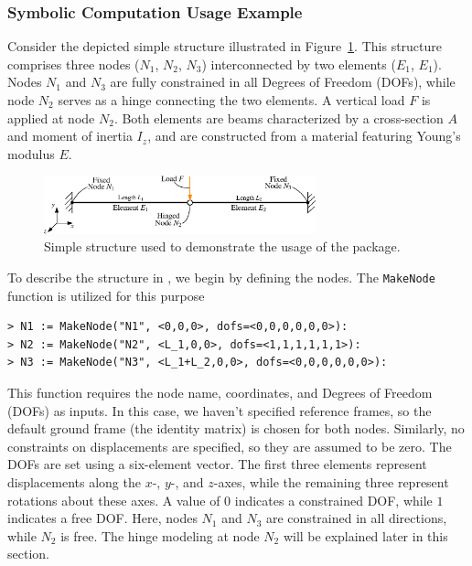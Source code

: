 \subsubsection*{\TrussMe{} Symbolic Computation Usage Example}

Consider the depicted simple structure illustrated in Figure~\ref{chap5:fig:usage_example}. This structure comprises three nodes ($N_1$, $N_2$, $N_3$) interconnected by two elements ($E_1$, $E_1$). Nodes $N_1$ and $N_3$ are fully constrained in all Degrees of Freedom (\acp{DOF}), while node $N_2$ serves as a hinge connecting the two elements. A vertical load $F$ is applied at node $N_2$. Both elements are beams characterized by a cross-section $A$ and moment of inertia $I_z$, and are constructed from a material featuring Young's modulus $E$.

\begin{figure}[!ht]
  \centering
  \includegraphics[width=0.7\textwidth]{./figures/chapter_5/usage_example.eps}
  \caption{Simple structure used to demonstrate the usage of the \TrussMe{} package.}
  \label{chap5:fig:usage_example}
\end{figure}

To describe the structure in \TrussMe{}, we begin by defining the nodes. The \texttt{MakeNode} function is utilized for this purpose
%
\begin{verbatim}
> N1 := MakeNode("N1", <0,0,0>, dofs=<0,0,0,0,0,0>):
> N2 := MakeNode("N2", <L_1,0,0>, dofs=<1,1,1,1,1,1>):
> N3 := MakeNode("N3", <L_1+L_2,0,0>, dofs=<0,0,0,0,0,0>):
\end{verbatim}
%
This function requires the node name, coordinates, and Degrees of Freedom (\acp{DOF}) as inputs. In this case, we haven't specified reference frames, so the default ground frame (the identity matrix) is chosen for both nodes. Similarly, no constraints on displacements are specified, so they are assumed to be zero. The \acp{DOF} are set using a six-element vector. The first three elements represent displacements along the $x$-, $y$-, and $z$-axes, while the remaining three represent rotations about these axes. A value of $0$ indicates a constrained \ac{DOF}, while $1$ indicates a free \ac{DOF}. Here, nodes $N_1$ and $N_3$ are constrained in all directions, while $N_2$ is free. The hinge modeling at node $N_2$ will be explained later in this section.

